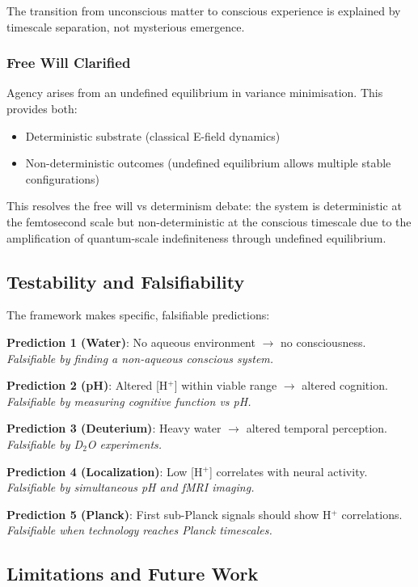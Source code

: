 \documentclass[12pt,a4paper]{article}
\begin{document}
The transition from unconscious matter to conscious experience is explained by timescale separation, not mysterious emergence.

\subsubsection{Free Will Clarified}

Agency arises from an undefined equilibrium in variance minimisation. This provides both:
\begin{itemize}
\item Deterministic substrate (classical E-field dynamics)
\item Non-deterministic outcomes (undefined equilibrium allows multiple stable configurations)
\end{itemize}

This resolves the free will vs determinism debate: the system is deterministic at the femtosecond scale but non-deterministic at the conscious timescale due to the amplification of quantum-scale indefiniteness through undefined equilibrium.

\subsection{Testability and Falsifiability}

The framework makes specific, falsifiable predictions:

\textbf{Prediction 1 (Water)}: No aqueous environment $\rightarrow$ no consciousness. \textit{Falsifiable by finding a non-aqueous conscious system.}

\textbf{Prediction 2 (pH)}: Altered [H$^+$] within viable range $\rightarrow$ altered cognition. \textit{Falsifiable by measuring cognitive function vs pH.}

\textbf{Prediction 3 (Deuterium)}: Heavy water $\rightarrow$ altered temporal perception. \textit{Falsifiable by D$_2$O experiments.}

\textbf{Prediction 4 (Localization)}: Low [H$^+$] correlates with neural activity. \textit{Falsifiable by simultaneous pH and fMRI imaging.}

\textbf{Prediction 5 (Planck)}: First sub-Planck signals should show H$^+$ correlations. \textit{Falsifiable when technology reaches Planck timescales.}

\subsection{Limitations and Future Work}
\end{document}
